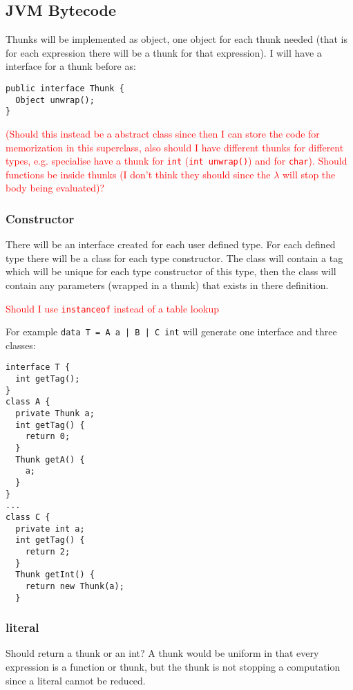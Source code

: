 \documentclass[12pt,a4paper,twoside]{article}
\begin{document}
\subsection{JVM Bytecode}

Thunks will be implemented as object, one object for each thunk needed (that is for each expression there will be a thunk for that expression).
I will have a interface for a thunk before as:

\begin{verbatim}
public interface Thunk {
  Object unwrap();
}
\end{verbatim}
\textcolor{red}{(Should this instead be a abstract class since then I can store the code for memorization in this superclass, also should I have different thunks for different types,
e.g. specialise have a thunk for \texttt{int} (\texttt{int unwrap()}) and for \texttt{char}).
Should functions be inside thunks (I don't think they should since the $\lambda$ will stop the body being evaluated)?}

\subsubsection{Constructor}

There will be an interface created for each user defined type. 
For each defined type there will be a class for each type constructor. The class will contain a tag which will be unique for each type constructor of this type,
then the class will contain any parameters (wrapped in a thunk) that exists in there definition.

\textcolor{red}{Should I use \texttt{instanceof} instead of a table lookup}

For example \texttt{data T = A a | B | C int} will generate one interface and three classes:

\begin{verbatim}
interface T {
  int getTag();
}
class A {
  private Thunk a;
  int getTag() {
    return 0;
  }
  Thunk getA() {
    a;
  }
}
...
class C {
  private int a;
  int getTag() {
    return 2;
  }
  Thunk getInt() {
    return new Thunk(a);
  }
\end{verbatim}

\subsubsection{literal}
Should return a thunk or an int? A thunk would be uniform in that every expression is a function or thunk, but the thunk is not stopping a computation since
a literal cannot be reduced.
\end{document}
